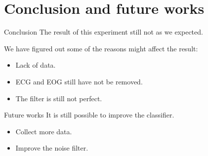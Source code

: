 \documentclass[xcolor=dvipsnames]{beamer} %
\begin{document}
	\section{Conclusion and future works}
	
	\begin{frame}{Conclusion}
	The result of this experiment still not as we expected.
	
	We have figured out some of the reasons might affect the result:
	    \begin{itemize}
	        \item Lack of data.
	        \pause
	        \item ECG and EOG still have not be removed.
	        \pause
	        \item The filter is still not perfect.
	    \end{itemize}
	\end{frame}

	\begin{frame}{Future works}
	It is still possible to improve the classifier.
		\begin{itemize}
			\item Collect more data.
			\item Improve the noise filter.
		\end{itemize}
	\end{frame}
	
\end{document}
